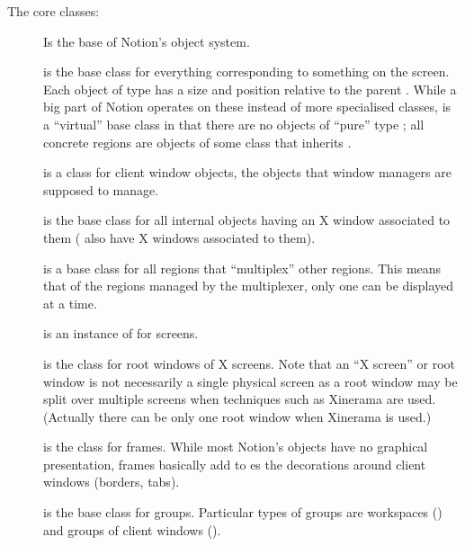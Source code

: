 The core classes:

\begin{description}
  \item[]
    Is the base of Notion's object system.

  \item[]
    is the base class for everything corresponding to something on the
    screen. Each object of type  has a size and  position
    relative to the parent . While a big part of Notion 
    operates on these instead of more specialised classes, 
    is a ``virtual''  base class in that there are no objects of ``pure''
    type ; all concrete regions are objects of some class 
    that inherits .

  \item[] is a class for
    client window objects, the objects that window managers are
    supposed to manage.

  \item[] is the base class for all
    internal objects having an X window associated to them
    ( also have X windows associated to them).
    
  \item[] is a base class for all regions that ``multiplex'' 
    other regions. This means that of the regions managed by the multiplexer,
    only one can be displayed at a time. 
  
  \item[] is an instance of 
    for screens.
    
  \item[] is the class for
    root windows of X screens.
    Note that an ``X screen'' or root window is not necessarily a
    single physical screen as a root window
    may be split over multiple screens when techniques such as 
    Xinerama are used. (Actually there can be only 
    one root window when Xinerama is used.) 
    
  \item[] is the class for frames.
    While most Notion's objects have no graphical presentation, frames 
    basically add to es the decorations around client 
    windows (borders, tabs).
    
  \item[] is the base class for groups.
    Particular types of groups are workspaces 
    ()
    and groups of client windows
    ().
\end{description}


